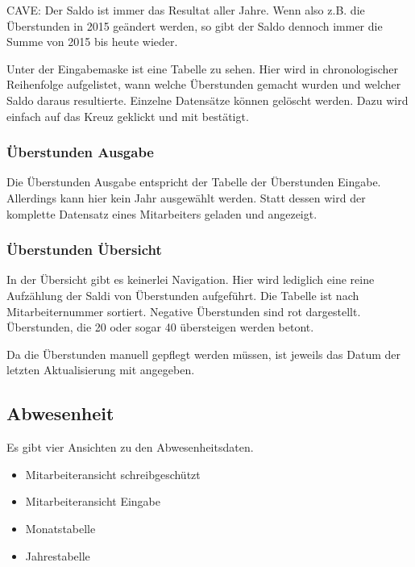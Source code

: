 CAVE: Der Saldo ist immer das Resultat aller Jahre. Wenn also z.B. die Überstunden in 2015 geändert werden, so gibt der Saldo dennoch immer die Summe von 2015 bis heute wieder.

Unter der Eingabemaske ist eine Tabelle zu sehen. Hier wird in chronologischer Reihenfolge aufgelistet, wann welche Überstunden gemacht wurden und welcher Saldo daraus resultierte. Einzelne Datensätze können gelöscht werden. Dazu wird einfach auf das Kreuz  geklickt und mit  bestätigt.

\subsubsection{Überstunden Ausgabe}
\begin{description}
    \item {}
\end{description}
Die Überstunden Ausgabe entspricht der Tabelle der Überstunden Eingabe. Allerdings kann hier kein Jahr ausgewählt werden. Statt dessen wird der komplette Datensatz eines Mitarbeiters geladen und angezeigt.


\subsubsection{Überstunden Übersicht}
\begin{description}
    \item {}
\end{description}
In der Übersicht gibt es keinerlei Navigation. Hier wird lediglich eine reine Aufzählung der Saldi von Überstunden aufgeführt. Die Tabelle ist nach Mitarbeiternummer sortiert. Negative Überstunden sind rot dargestellt. Überstunden, die 20 oder sogar 40 übersteigen werden betont.

Da die Überstunden manuell gepflegt werden müssen, ist jeweils das Datum der letzten Aktualisierung mit angegeben.

\subsection{Abwesenheit}
Es gibt vier Ansichten zu den Abwesenheitsdaten.
\begin{itemize}
\item Mitarbeiteransicht schreibgeschützt
\item Mitarbeiteransicht Eingabe
\item Monatstabelle
\item Jahrestabelle
\end{itemize}
